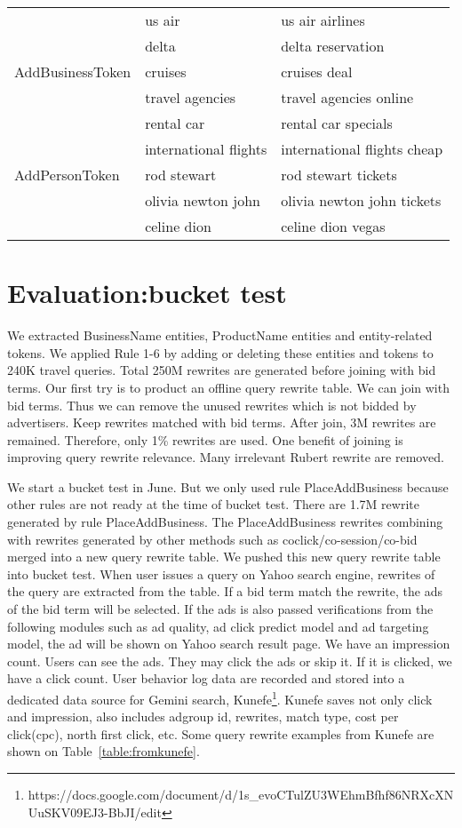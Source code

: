 \documentclass{sig-alternate}
\begin{document}
\begin{table*}
\begin{center}
\begin{tabular}{|l|l|l|}
		& us air & us air airlines \\
             & delta  &  delta reservation \\ \hline
AddBusinessToken & cruises & cruises deal \\ 
		& travel agencies & travel agencies online \\
		& rental car    &  rental car specials  \\
               & international flights  & international flights cheap \\ \hline
AddPersonToken & rod stewart    & rod stewart tickets \\
		& olivia newton john    &  olivia newton john tickets \\
		& celine dion   &  celine dion vegas \\ \hline
\end{tabular}

\label{table:fromkunefe}
\end{center}
\end{table*}

\section{Evaluation:bucket test}
We extracted BusinessName entities, ProductName entities and entity-related tokens. We applied Rule 1-6 by adding or deleting these entities and tokens to 240K travel queries. Total 250M rewrites are generated before joining with bid terms. Our first try is to product an offline query rewrite table. We can join with bid terms. Thus we can remove the unused rewrites which is not bidded by advertisers. Keep rewrites matched with bid terms.  After join, 3M rewrites are remained. Therefore, only 1\% rewrites are used. One benefit of joining  is  improving query rewrite relevance. Many irrelevant Rubert rewrite are removed.  

We start a bucket test in June. But we only used rule PlaceAddBusiness because other rules are not ready at the time of bucket test. There are 1.7M rewrite generated by rule PlaceAddBusiness. 
 The PlaceAddBusiness rewrites combining with rewrites generated by other methods such as coclick/co-session/co-bid merged into a new query rewrite table. We pushed this new query rewrite table  into bucket test.  When user issues a query on Yahoo search engine, rewrites of the query are extracted from the table. If a bid term match the rewrite, the ads of the bid term will be selected. If the ads is also passed verifications from the following modules  such as ad quality, ad click predict model and ad targeting model, the ad will be shown on Yahoo search result page.  We have an impression count. Users can see the ads. They may click the ads or skip it. If it is clicked, we have a click count. User behavior log data are recorded and stored into  a dedicated data source for Gemini search, Kunefe\footnote{https://docs.google.com/document/d/1s\_evoCTulZU3WEhmBfhf86NRXcXNUuSKV09EJ3-BbJI/edit}. Kunefe saves not only click and impression, also includes adgroup id, rewrites, match type, cost per click(cpc), north first click, etc. Some query rewrite examples from Kunefe are shown on Table~\ref{table:fromkunefe}.
\end{document}
